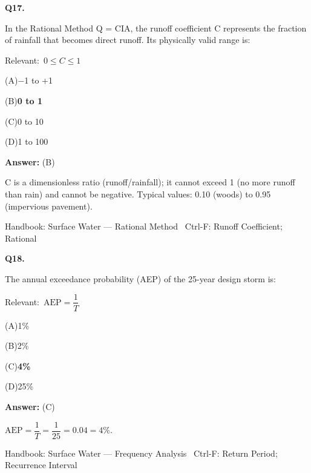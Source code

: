 \documentclass[11pt]{article}
\newcommand{\correct}[1]{\textbf{#1}\;{\color{accent}$\checkmark$}}
\newcommand{\optline}[2]{\par\noindent\hspace{1.2em}(#1)\hspace{0.6em}#2}
\begin{document}
\vspace{9pt}
\filbreak
\textbf{\color{accent}Q17.}\par\vspace{2pt}
In the Rational Method Q = CIA, the runoff coefficient C represents the fraction of rainfall that becomes direct runoff. Its physically valid range is:\par\vspace{3pt}
{\small\color{soft}Relevant:}\ $0 \le C \le 1$\par\vspace{3pt}
\optline{A}{$-$1 to +1}
\optline{B}{\correct{0 to 1}}
\optline{C}{0 to 10}
\optline{D}{1 to 100}
\par\vspace{3pt}
\vspace{2pt}\par\noindent\colorbox{boxbg}{\parbox{\dimexpr\linewidth-2\fboxsep\relax}{%
\vspace{2pt}\textbf{Answer:} (B)\par\vspace{2pt}
{\small C is a dimensionless ratio (runoff/rainfall); it cannot exceed 1 (no more runoff than rain) and cannot be negative. Typical values: 0.10 (woods) to 0.95 (impervious pavement).}\par\vspace{2pt}
{\footnotesize\color{soft}Handbook: Surface Water --- Rational Method \textbullet\ Ctrl-F: Runoff Coefficient; Rational}\vspace{2pt}
}}
\vspace{9pt}
\filbreak
\textbf{\color{accent}Q18.}\par\vspace{2pt}
The annual exceedance probability (AEP) of the 25-year design storm is:\par\vspace{3pt}
{\small\color{soft}Relevant:}\ $\text{AEP} = \dfrac{1}{T}$\par\vspace{3pt}
\optline{A}{1\%}
\optline{B}{2\%}
\optline{C}{\correct{4\%}}
\optline{D}{25\%}
\par\vspace{3pt}
\vspace{2pt}\par\noindent\colorbox{boxbg}{\parbox{\dimexpr\linewidth-2\fboxsep\relax}{%
\vspace{2pt}\textbf{Answer:} (C)\par\vspace{2pt}
{\small $\text{AEP} = \dfrac{1}{T} = \dfrac{1}{25} = 0.04 = 4\%$.}\par\vspace{2pt}
{\footnotesize\color{soft}Handbook: Surface Water --- Frequency Analysis \textbullet\ Ctrl-F: Return Period; Recurrence Interval}\vspace{2pt}
}}
\end{document}
